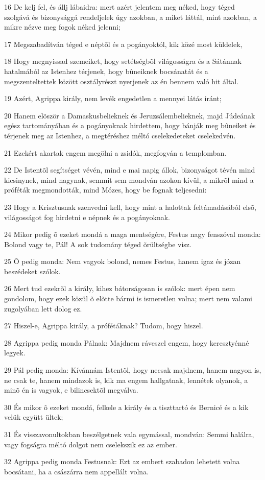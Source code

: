\par 16 De kelj fel, és állj lábaidra: mert azért jelentem meg néked, hogy téged szolgává és bizonysággá rendeljelek úgy azokban, a miket láttál, mint azokban, a mikre nézve meg fogok néked jelenni;
\par 17 Megszabadítván téged e néptõl és a pogányoktól, kik közé most küldelek,
\par 18 Hogy megnyissad szemeiket, hogy setétségbõl világosságra és a Sátánnak hatalmából az Istenhez térjenek, hogy bûneiknek bocsánatát és a megszenteltettek között  osztályrészt nyerjenek az én bennem való hit által.
\par 19 Azért, Agrippa király, nem levék engedetlen a mennyei látás iránt;
\par 20 Hanem elõször a Damaskusbelieknek és Jeruzsálembelieknek, majd Júdeának egész tartományában és a pogányoknak hirdettem, hogy bánják meg bûneiket és térjenek meg az  Istenhez, a megtéréshez méltó cselekedeteket cselekedvén.
\par 21 Ezekért akartak engem megölni a zsidók, megfogván a templomban.
\par 22 De Istentõl segítséget vévén, mind e mai napig állok, bizonyságot tévén mind kicsinynek, mind nagynak, semmit sem mondván azokon kívül, a mikrõl mind a próféták megmondották, mind Mózes, hogy be fognak teljesedni:
\par 23 Hogy a Krisztusnak szenvedni kell, hogy mint a halottak feltámadásából elsõ, világosságot  fog hirdetni e népnek és a pogányoknak.
\par 24 Mikor pedig õ ezeket mondá a maga mentségére, Festus nagy fenszóval monda: Bolond vagy te, Pál! A sok tudomány téged õrültségbe visz.
\par 25 Õ pedig monda: Nem vagyok bolond, nemes Festus, hanem igaz és józan beszédeket szólok.
\par 26 Mert tud ezekrõl a király, kihez bátorságosan is szólok: mert épen nem gondolom, hogy ezek közül õ elõtte bármi is ismeretlen volna; mert nem valami zugolyában lett dolog ez.
\par 27 Hiszel-e, Agrippa király, a prófétáknak? Tudom, hogy hiszel.
\par 28 Agrippa pedig monda Pálnak: Majdnem ráveszel engem, hogy keresztyénné legyek.
\par 29 Pál pedig monda: Kívánnám Istentõl, hogy necsak majdnem, hanem nagyon is, ne csak te, hanem mindazok is, kik ma engem hallgatnak, lennétek olyanok, a minõ én is vagyok, e bilincsektõl megválva.
\par 30 És mikor õ ezeket mondá, felkele a király és a tiszttartó és Bernicé és a kik velük együtt ültek;
\par 31 És visszavonultokban beszélgetnek vala egymással, mondván: Semmi halálra, vagy fogságra méltó dolgot nem cselekszik ez az ember.
\par 32 Agrippa pedig monda Festusnak: Ezt az embert szabadon lehetett volna bocsátani, ha a császárra nem appellált volna.

